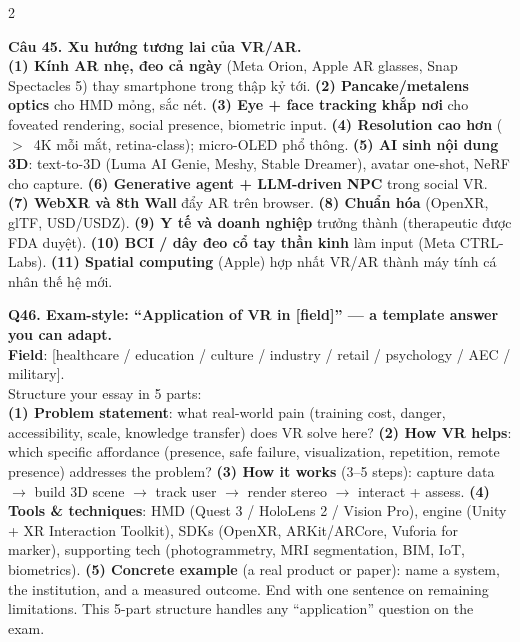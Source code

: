 \begin{paracol}{2}
\switchcolumn

\textbf{Câu 45. Xu hướng tương lai của VR/AR.}\\
\textbf{(1) Kính AR nhẹ, đeo cả ngày} (Meta Orion, Apple AR glasses, Snap Spectacles 5) thay smartphone trong thập kỷ tới. \textbf{(2) Pancake/metalens optics} cho HMD mỏng, sắc nét. \textbf{(3) Eye + face tracking khắp nơi} cho foveated rendering, social presence, biometric input. \textbf{(4) Resolution cao hơn} ($>$~4K mỗi mắt, retina-class); micro-OLED phổ thông. \textbf{(5) AI sinh nội dung 3D}: text-to-3D (Luma AI Genie, Meshy, Stable Dreamer), avatar one-shot, NeRF cho capture. \textbf{(6) Generative agent + LLM-driven NPC} trong social VR. \textbf{(7) WebXR và \textbf{8th Wall}} đẩy AR trên browser. \textbf{(8) Chuẩn hóa} (OpenXR, glTF, USD/USDZ). \textbf{(9) Y tế và doanh nghiệp} trưởng thành (therapeutic được FDA duyệt). \textbf{(10) BCI / dây đeo cổ tay thần kinh} làm input (Meta CTRL-Labs). \textbf{(11) Spatial computing} (Apple) hợp nhất VR/AR thành máy tính cá nhân thế hệ mới.

\switchcolumn*

\textbf{Q46. Exam-style: ``Application of VR in [field]'' --- a template answer you can adapt.}\\
\textbf{Field}: [healthcare / education / culture / industry / retail / psychology / AEC / military].\\
Structure your essay in 5 parts:\\
\textbf{(1) Problem statement}: what real-world pain (training cost, danger, accessibility, scale, knowledge transfer) does VR solve here? \textbf{(2) How VR helps}: which specific affordance (presence, safe failure, visualization, repetition, remote presence) addresses the problem? \textbf{(3) How it works} (3--5 steps): capture data $\to$ build 3D scene $\to$ track user $\to$ render stereo $\to$ interact + assess. \textbf{(4) Tools \& techniques}: HMD (Quest 3 / HoloLens 2 / Vision Pro), engine (Unity + XR Interaction Toolkit), SDKs (OpenXR, ARKit/ARCore, Vuforia for marker), supporting tech (photogrammetry, MRI segmentation, BIM, IoT, biometrics). \textbf{(5) Concrete example} (a real product or paper): name a system, the institution, and a measured outcome. End with one sentence on remaining limitations. This 5-part structure handles any ``application'' question on the exam.

\switchcolumn


\end{paracol}
